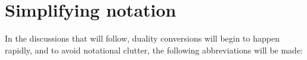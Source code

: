 %
%
%



\section{Simplifying notation}

In the discussions that will follow, duality conversions will begin to happen rapidly, and to avoid notational clutter, the following abbreviations will be made:


